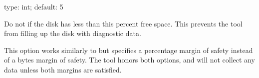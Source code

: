 \documentclass[letterpaper,10pt,english]{sphinxmanual}
\begin{document}
\begin{fulllineitems}
\label{\detokenize{mariadb-stat:cmdoption-mariadb-stat-disk-pct-free}}
type: int; default: 5

Do not {\hyperref[\detokenize{mariadb-stat:cmdoption-mariadb-stat-collect}]{}} if the disk has less than this percent free space.
This prevents the tool from filling up the disk with diagnostic data.

This option works similarly to {\hyperref[\detokenize{mariadb-stat:cmdoption-mariadb-stat-disk-bytes-free}]{}} but specifies a
percentage margin of safety instead of a bytes margin of safety.
The tool honors both options, and will not collect any data unless both
margins are satisfied.

\end{fulllineitems}

\end{document}
